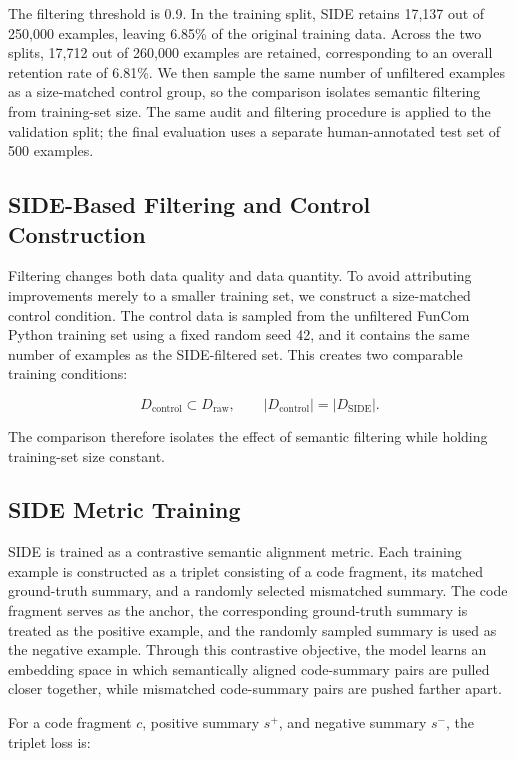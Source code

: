 The filtering threshold is 0.9. In the training split, SIDE retains 17,137 out of 250,000 examples, leaving 6.85\% of the original training data. Across the two splits, 17,712 out of 260,000 examples are retained, corresponding to an overall retention rate of 6.81\%. We then sample the same number of unfiltered examples as a size-matched control group, so the comparison isolates semantic filtering from training-set size. The same audit and filtering procedure is applied to the validation split; the final evaluation uses a separate human-annotated test set of 500 examples.

\subsection{SIDE-Based Filtering and Control Construction}

Filtering changes both data quality and data quantity. To avoid attributing improvements merely to a smaller training set, we construct a size-matched control condition. The control data is sampled from the unfiltered FunCom Python training set using a fixed random seed 42, and it contains the same number of examples as the SIDE-filtered set. This creates two comparable training conditions:

\[
D_{\text{control}} \subset D_{\text{raw}},
\qquad
|D_{\text{control}}| = |D_{\text{SIDE}}|.
\]

The comparison therefore isolates the effect of semantic filtering while holding training-set size constant.


\subsection{SIDE Metric Training}

SIDE is trained as a contrastive semantic alignment metric. Each training example is constructed as a triplet consisting of a code fragment, its matched ground-truth summary, and a randomly selected mismatched summary. The code fragment serves as the anchor, the corresponding ground-truth summary is treated as the positive example, and the randomly sampled summary is used as the negative example. Through this contrastive objective, the model learns an embedding space in which semantically aligned code-summary pairs are pulled closer together, while mismatched code-summary pairs are pushed farther apart.

For a code fragment \(c\), positive summary \(s^{+}\), and negative summary \(s^{-}\), the triplet loss is:

